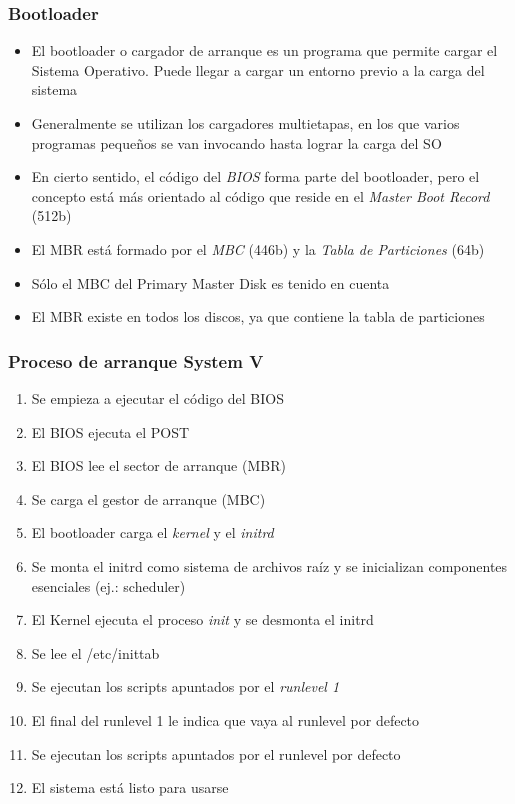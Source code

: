 \begin{frame}
  \frametitle{Bootloader}
  \begin{itemize}
  	\item El bootloader o cargador de arranque es un programa que permite cargar el Sistema Operativo. Puede llegar a cargar un entorno previo a la carga del sistema

  	\item Generalmente se utilizan los cargadores multietapas, en los que varios programas pequeños se van invocando hasta lograr la carga del SO

  	\item En cierto sentido, el código del \textit{BIOS} forma parte del bootloader, pero el concepto está más orientado al código que reside en el \textit{Master Boot Record} (512b)

  	\item El MBR está formado por el \textit{MBC} (446b) y la \textit{Tabla de Particiones} (64b)

  	\item Sólo el MBC del Primary Master Disk es tenido en cuenta

  	\item El MBR existe en todos los discos, ya que contiene la tabla de particiones
  \end{itemize}
\end{frame}

\begin{frame}
  \frametitle{Proceso de arranque \textbf{System V}}
  \begin{enumerate}
	\item Se empieza a ejecutar el código del BIOS
	\item El BIOS ejecuta el POST
	\item El BIOS lee el sector de arranque (MBR)
	\item Se carga el gestor de arranque (MBC)
	\item El bootloader carga el \textit{kernel} y el \textit{initrd}
	\item Se monta el initrd como sistema de archivos raíz y se inicializan componentes esenciales (ej.: scheduler)
	\item El Kernel ejecuta el proceso \textit{init} y se desmonta el initrd
	\item Se lee el /etc/inittab
	\item Se ejecutan los scripts apuntados por el \textit{runlevel 1}
	\item El final del runlevel 1 le indica que vaya al runlevel por defecto
	\item Se ejecutan los scripts apuntados por el runlevel por defecto
	\item El sistema está listo para usarse
  \end{enumerate}
\end{frame}

